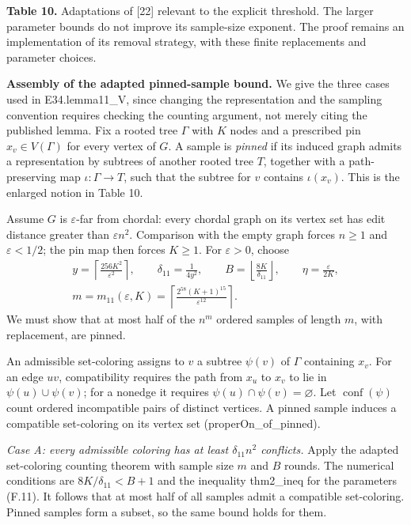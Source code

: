 \documentclass[english,11pt,a4paper]{article}
\newcounter{none}
\begin{document}
\textbf{Table 10.} Adaptations of {[}22{]} relevant to the explicit threshold. The larger parameter bounds do not improve its sample-size exponent. The proof remains an implementation of its removal strategy, with these finite replacements and parameter choices.

\textbf{Assembly of the adapted pinned-sample bound.} We give the three cases used in {\ttfamily\small E34.\discretionary{\hbox{\ensuremath{\hookrightarrow}}}{}{}lemma11\_\discretionary{\hbox{\ensuremath{\hookrightarrow}}}{}{}V}, since changing the representation and the sampling convention requires checking the counting argument, not merely citing the published lemma. Fix a rooted tree \(\Gamma\) with \(K\) nodes and a prescribed pin \(x_v\in V(\Gamma)\) for every vertex of \(G\). A sample is \emph{pinned} if its induced graph admits a representation by subtrees of another rooted tree \(T\), together with a path-preserving map \(\iota:\Gamma\to T\), such that the subtree for \(v\) contains \(\iota(x_v)\). This is the enlarged notion in Table 10.

Assume \(G\) is \(\varepsilon\)-far from chordal: every chordal graph on its vertex set has edit distance greater than \(\varepsilon n^2\). Comparison with the empty graph forces \(n\ge1\) and \(\varepsilon<1/2\); the pin map then forces \(K\ge1\). For \(\varepsilon>0\), choose \[
\begin{gathered}
y=\left\lceil\frac{256K^2}{\varepsilon^2}\right\rceil,\qquad
\delta_{11}=\frac1{4y^2},\qquad
B=\left\lfloor\frac{8K}{\delta_{11}}\right\rfloor,\qquad
\eta=\frac{\varepsilon}{2K},\\
m=m_{11}(\varepsilon,K)
 =\left\lceil\frac{2^{58}(K+1)^{15}}{\varepsilon^{12}}\right\rceil.
\end{gathered}
\tag{F.11}
\] We must show that at most half of the \(n^m\) ordered samples of length \(m\), with replacement, are pinned.

An admissible set-coloring assigns to \(v\) a subtree \(\psi(v)\) of \(\Gamma\) containing \(x_v\). For an edge \(uv\), compatibility requires the path from \(x_u\) to \(x_v\) to lie in \(\psi(u)\cup\psi(v)\); for a nonedge it requires \(\psi(u)\cap\psi(v)=\varnothing\). Let \(\operatorname{conf}(\psi)\) count ordered incompatible pairs of distinct vertices. A pinned sample induces a compatible set-coloring on its vertex set ({\ttfamily\small properOn\_\discretionary{\hbox{\ensuremath{\hookrightarrow}}}{}{}of\_\discretionary{\hbox{\ensuremath{\hookrightarrow}}}{}{}pinned}).

\emph{Case A: every admissible coloring has at least \(\delta_{11}n^2\) conflicts.} Apply the adapted set-coloring counting theorem with sample size \(m\) and \(B\) rounds. The numerical conditions are \(8K/\delta_{11}<B+1\) and the inequality {\ttfamily\small thm2\_\discretionary{\hbox{\ensuremath{\hookrightarrow}}}{}{}ineq} for the parameters (F.11). It follows that at most half of all samples admit a compatible set-coloring. Pinned samples form a subset, so the same bound holds for them.
\end{document}
